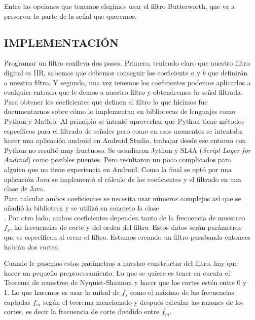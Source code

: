 Entre las opciones que tenemos elegimos usar el filtro Butterworth, que va a preservar la parte de la señal que queremos.

\subsection{IMPLEMENTACIÓN}

Programar un filtro conlleva dos pasos. Primero, teniendo claro que nuestro filtro digital es IIR, sabemos que debemos conseguir los coeficiente $a$ y $b$ que definirán a nuestro filtro. Y segundo, una vez tenemos los coeficientes podemos aplicarlos a cualquier entrada que le demos a nuestro filtro y obtendremos la señal filtrada.\\

Para obtener los coeficientes que definen al filtro lo que hicimos fue documentarnos sobre cómo lo implementan en bibliotecas de lenguajes como Python y Matlab. 
Al principio se intentó aprovechar que Python tiene métodos específicos para el filtrado de señales pero como en esos momentos se intentaba hacer una aplicación android en Android Studio, trabajar desde ese entorno con Python no resultó muy fructuoso. Se estudiaron Jython y SL4A (\emph{Script Layer for Android}) como posibles puentes. Pero resultaron un poco complicados para alguien que no tiene experiencia en Android. Como la final se optó por una aplicación Java se implementó el cálculo de los coeficientes y el filtrado en una clase de Java. \\

Para calcular ambos coeficientes se necesita usar números complejos así que se añadió la biblioteca  y se utilizó en concreto la clase \\. Por otro lado, ambos coeficientes dependen tanto de la frecuencia de muestreo $f_s$, las frecuencias de corte y del orden del filtro. Estos datos serán parámetros que se especifican al crear el filtro. Estamos creando un filtro pasabanda entonces habrán dos cortes. 

Cuando le pasemos estos parámetros a nuestro constructor del filtro, hay que hacer un pequeño preprocesamiento. Lo que se quiere es tener en cuenta el Teorema de muestreo de Nyquist-Shannon y hacer que los cortes estén entre 0 y 1. Lo que haremos es usar la mitad de $f_s$ como el máximo de las frecuencias captadas $f_m$ según el teorema mencionado y después calcular las razones de los cortes, es decir la frecuencia de corte dividido entre $f_m$.

